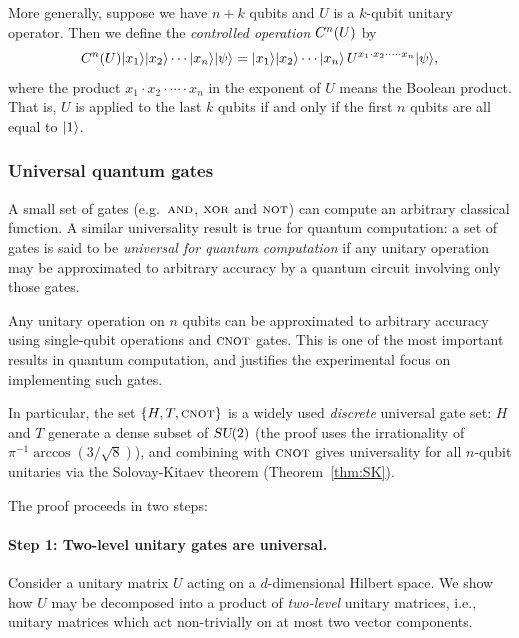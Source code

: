 More generally, suppose we have $n + k$ qubits and $U$ is a $k$-qubit
unitary operator.  Then we define the \emph{controlled operation}
$C^{n}(U)$ by
\begin{equation}
  C^{n}(U)|x_1\rangle|x_2\rangle\cdots |x_n\rangle|\psi\rangle
  = |x_1\rangle|x_2\rangle\cdots |x_n\rangle\, U^{x_1\cdot x_2\cdot \cdots \cdot x_n}|\psi\rangle,
\end{equation}
where the product $x_1\cdot x_2\cdot \cdots \cdot x_n$ in the exponent of $U$
means the Boolean product. That is, $U$ is applied to the last $k$ qubits if
and only if the first $n$ qubits are all equal to $|1\rangle$.

\subsubsection{Universal quantum gates}\label{subsubsec:universal}

A small set of gates (e.g.\ $\textsc{and}$, $\textsc{xor}$ and $\textsc{not}$) can compute an
arbitrary classical function.  A similar universality result is true for
quantum computation: a set of gates is said to be \emph{universal for
  quantum computation} if any unitary operation may be approximated to
arbitrary accuracy by a quantum circuit involving only those gates.

\begin{keyresult}
  Any unitary operation on $n$ qubits can be approximated to arbitrary
  accuracy using single-qubit operations and $\textsc{cnot}$ gates.  This is one of
  the most important results in quantum computation, and justifies the
  experimental focus on implementing such gates.
\end{keyresult}

In particular, the set $\{H, T, \textsc{cnot}\}$ is a widely used \emph{discrete}
universal gate set: $H$ and $T$ generate a dense subset of $\textsl{SU}(2)$ (the
proof uses the irrationality of $\pi^{-1}\arccos(3/\sqrt{8})$), and
combining with $\textsc{cnot}$ gives universality for all $n$-qubit unitaries via
the Solovay-Kitaev theorem (Theorem~\ref{thm:SK}).

The proof proceeds in two steps:

\paragraph{Step 1: Two-level unitary gates are universal.}
Consider a unitary matrix $U$ acting on a $d$-dimensional Hilbert space. We
show how $U$ may be decomposed into a product of \emph{two-level} unitary
matrices, i.e., unitary matrices which act non-trivially on at most two
vector components.

